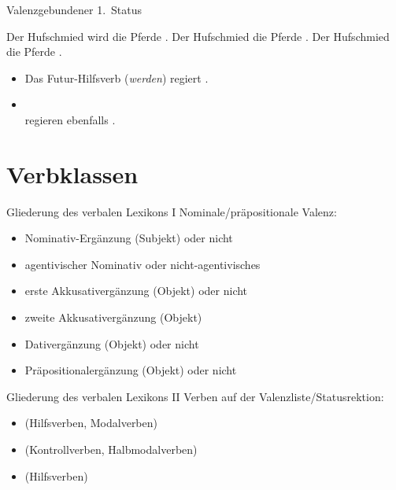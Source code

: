 \begin{frame}
  {Valenzgebundener 1.~Status}
  \onslide<+->
  \onslide<+->
  \begin{exe}
    \ex Der Hufschmied \alert{wird} die Pferde .
    \Halbzeile
    \onslide<+->
    \ex Der Hufschmied  die Pferde .
    \ex Der Hufschmied  die Pferde .
  \end{exe}
  \Zeile
  \begin{itemize}[<+->]
    \item Das \alert{Futur-Hilfsverb (\textit{werden})} regiert .
    \item {}\\
      regieren ebenfalls .
  \end{itemize}
\end{frame}

\section{Verbklassen}

\begin{frame}
  {Gliederung des verbalen Lexikons I}
  \onslide<+->
  \onslide<+->
  Nominale\slash präpositionale Valenz:\\
  \begin{itemize}[<+->]
    \item \alert{Nominativ-Ergänzung} (Subjekt) oder nicht
    \item \alert{agentivischer Nominativ} oder nicht-agentivisches 
    \item erste \alert{Akkusativergänzung} (Objekt) oder nicht
    \item zweite Akkusativergänzung (Objekt)
    \item \alert{Dativergänzung} (Objekt) oder nicht
    \item \alert{Präpositionalergänzung} (Objekt) oder nicht
  \end{itemize}
\end{frame}

\begin{frame}
  {Gliederung des verbalen Lexikons II}
  \onslide<+->
  \onslide<+->
  Verben auf der Valenzliste\slash Statusrektion:\\
  \begin{itemize}[<+->]
    \item {} (Hilfsverben, Modalverben)
    \item {} (Kontrollverben, Halbmodalverben)
    \item {} (Hilfsverben)
  \end{itemize}
\end{frame}


